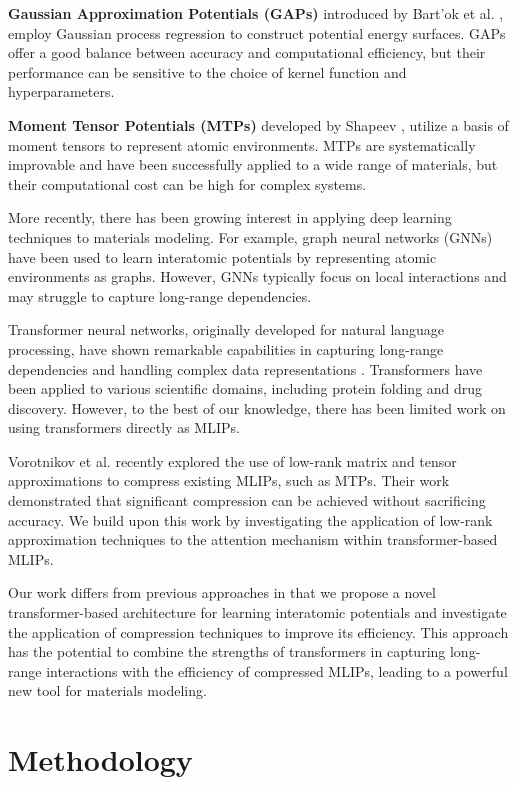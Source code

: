 \documentclass{article}
\begin{document}
\textbf{Gaussian Approximation Potentials (GAPs)} introduced by Bart{'o}k et al. \cite{bartok2010gaussian}, employ Gaussian process regression to construct potential energy surfaces. GAPs offer a good balance between accuracy and computational efficiency, but their performance can be sensitive to the choice of kernel function and hyperparameters.

\textbf{Moment Tensor Potentials (MTPs)} developed by Shapeev \cite{shapeev2016moment}, utilize a basis of moment tensors to represent atomic environments. MTPs are systematically improvable and have been successfully applied to a wide range of materials, but their computational cost can be high for complex systems.

More recently, there has been growing interest in applying deep learning techniques to materials modeling. For example, graph neural networks (GNNs) have been used to learn interatomic potentials by representing atomic environments as graphs. However, GNNs typically focus on local interactions and may struggle to capture long-range dependencies.

Transformer neural networks, originally developed for natural language processing, have shown remarkable capabilities in capturing long-range dependencies and handling complex data representations \cite{vaswani2017attention}. Transformers have been applied to various scientific domains, including protein folding and drug discovery. However, to the best of our knowledge, there has been limited work on using transformers directly as MLIPs.

Vorotnikov et al. \cite{vorotnikov2025low} recently explored the use of low-rank matrix and tensor approximations to compress existing MLIPs, such as MTPs. Their work demonstrated that significant compression can be achieved without sacrificing accuracy. We build upon this work by investigating the application of low-rank approximation techniques to the attention mechanism within transformer-based MLIPs.

Our work differs from previous approaches in that we propose a novel transformer-based architecture for learning interatomic potentials and investigate the application of compression techniques to improve its efficiency. This approach has the potential to combine the strengths of transformers in capturing long-range interactions with the efficiency of compressed MLIPs, leading to a powerful new tool for materials modeling.

\section{Methodology}
\end{document}
